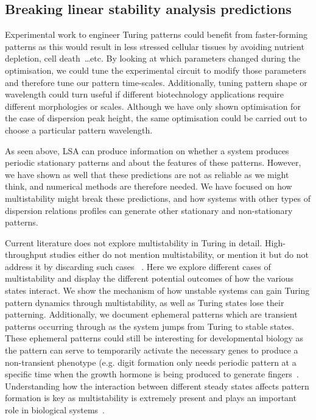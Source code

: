 \subsection*{Breaking linear stability analysis predictions}
Experimental work to engineer Turing patterns could benefit from faster-forming patterns as this would result in less stressed cellular tissues by avoiding nutrient depletion, cell death~\ldots etc.
By looking at which parameters changed during the optimisation, we could tune the experimental circuit to modify those parameters and therefore tune our pattern time-scales.
Additionally, tuning pattern shape or wavelength could turn useful if different biotechnology applications require different morphologies or scales.
Although we have only shown optimisation for the case of dispersion peak height, the same optimisation could be carried out to choose a particular pattern wavelength.

As seen above, LSA can produce information on whether a system produces periodic stationary patterns and about the features of these patterns.
However, we have shown as well that these predictions are not as reliable as we might think, and numerical methods are therefore needed.
We have focused on how multistability might break these predictions, and how systems with other types of dispersion relations profiles can generate other stationary and non-stationary patterns.

Current literature does not explore multistability in Turing in detail.
High-throughput studies either do not mention multistability, or mention it but do not address it by discarding such cases ~\parencite{Scholes2019, Marcon, Zheng2016}.
Here we explore different cases of multistability and display the different potential outcomes of how the various states interact.
We show the mechanism of how unstable systems can gain Turing pattern dynamics through multistability, as well as Turing states lose their patterning.
Additionally, we document ephemeral patterns which are transient patterns occurring through as the system jumps from Turing to stable states.
These ephemeral patterns could still be interesting for developmental biology as the pattern can serve to temporarily activate the necessary genes to produce a non-transient phenotype (e.g. digit formation only needs periodic pattern at a specific time when the growth hormone is being produced to generate fingers~\parencite{Raspopovic1}.
Understanding how the interaction between different steady states affects pattern formation is key as multistability is extremely present and plays an important role in biological systems~\parencite{laurent1999multistability}.


